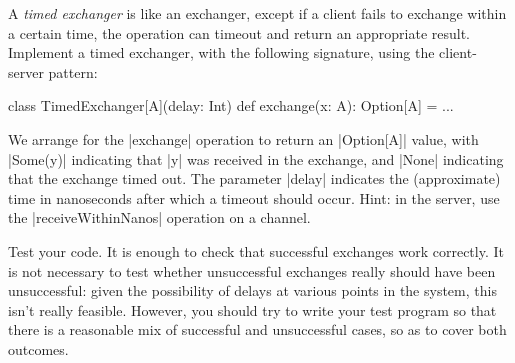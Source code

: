 \begin{questionS}
\label{ex:timedExchanger}
A \emph{timed exchanger} is like an exchanger, except if a client fails to
exchange within a certain time, the operation can timeout and return an
appropriate result.  Implement a timed exchanger, with the following
signature, using the client-server pattern:
%
\begin{scala}
class TimedExchanger[A](delay: Int){
  def exchange(x: A): Option[A] = ...
}
\end{scala}
%
We arrange for the |exchange| operation to return an |Option[A]| value, with
|Some(y)| indicating that |y| was received in the exchange, and |None|
indicating that the exchange timed out.  The parameter |delay| indicates the
(approximate) time in nanoseconds after which a timeout should occur.  Hint:
in the server, use the |receiveWithinNanos| operation on a channel.

Test your code.  It is enough to check that successful exchanges work
correctly.  It is not necessary to test whether unsuccessful exchanges really
should have been unsuccessful: given the possibility of delays at various
points in the system, this isn't really feasible.  However, you should try to
write your test program so that there is a reasonable mix of successful and
unsuccessful cases, so as to cover both outcomes. 
\end{questionS}



